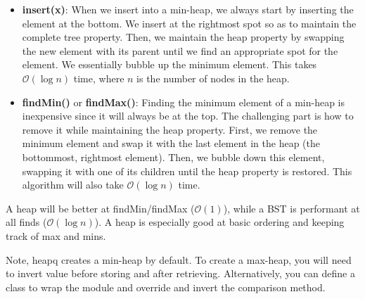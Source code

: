 \documentclass{article}
\newcommand{\bigO}{\mathcal{O}}
\begin{document}
    \begin{itemize}
        \item \textbf{insert(x)}: When we insert into a min-heap, we always start by inserting the element at the bottom. We insert at the rightmost spot so as to maintain the complete tree property. Then, we maintain the heap property by swapping the new element with its parent until we find an appropriate spot for the element. We essentially bubble up the minimum element. This takes $\bigO (\log n)$ time, where $n$ is the number of nodes in the heap. 
        
        \item \textbf{findMin()} or \textbf{findMax()}: Finding the minimum element of a min-heap is inexpensive since it will always be at the top. The challenging part is how to remove it while maintaining the heap property. First, we remove the minimum element and swap it with the last element in the heap (the bottommost, rightmost element). Then, we bubble down this element, swapping it with one of its children until the heap property is restored. This algorithm will also take $\bigO( \log n)$ time. 
    \end{itemize}
    
    A heap will be better at findMin/findMax ($\bigO(1)$), while a BST is performant at all finds ($\bigO(\log n)$). A heap is especially good at basic ordering and keeping track of max and mins.
    
    Note, heapq creates a min-heap by default. To create a max-heap, you will need to invert value before storing and after retrieving. Alternatively, you can define a class to wrap the module and override and invert the comparison method.
\end{document}
